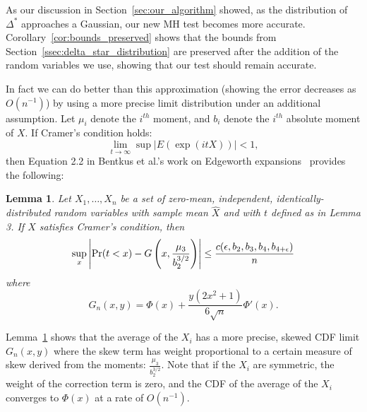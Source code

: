 \documentclass{article}
\newtheorem{lemma}{Lemma}
\begin{document}
As our discussion in Section~\ref{sec:our_algorithm} showed, as the distribution
of $\Delta^*$ approaches a Gaussian, our new MH test becomes more accurate.
Corollary~\ref{cor:bounds_preserved} shows that the bounds from
Section~\ref{ssec:delta_star_distribution} are preserved after the addition of
the random variables we use, showing that our test should remain accurate.


In fact we can do better than this approximation (showing the error decreases as
$O(n^{-1})$) by using a more precise limit distribution under an additional
assumption. Let $\mu_i$ denote the $i^{th}$ moment, and $b_i$ denote the
$i^{th}$ absolute moment of $X$. If Cramer's condition holds:
\begin{equation}\label{eq:cramers_condition}
    \lim_{t \to \infty} \sup |E(\exp(i t X))| < 1,
\end{equation}
then Equation 2.2 in Bentkus et al.'s work on Edgeworth
expansions~\cite{Bentkus97} provides the following:

\begin{lemma}\label{lem:clt_edgeworth}
Let $X_1,\ldots,X_n$ be a set of zero-mean, independent, identically-distributed
random variables with sample mean $\hat{X}$ and with $t$ defined as in Lemma 3.
If $X$ satisfies Cramer's condition, then
\begin{equation}\label{eq:clt-bounds_edgeworth}
    \sup_x\left|{\rm Pr}(t<x) - G\left(x, \frac{\mu_3}{b_2^{3/2}}\right)\right| \leq \frac{c(\epsilon,b_2,b_3,b_4,b_{4+\epsilon})}{n}
\end{equation}
where
\begin{equation}
    G_n(x,y) = \Phi(x) + \frac{y(2x^2+1)}{6\sqrt{n}}\Phi'(x).
\end{equation}
\end{lemma}

Lemma~\ref{lem:clt_edgeworth} shows that the average of the $X_i$ has a more
precise, skewed CDF limit $G_n(x,y)$ where the skew term has weight proportional
to a certain measure of skew derived from the moments:
$\frac{\mu_3}{b_2^{3/2}}$. Note that if the $X_i$ are symmetric, the weight of
the correction term is zero, and the CDF of the average of the $X_i$ converges
to $\Phi(x)$ at a rate of $O(n^{-1})$.
\end{document}
